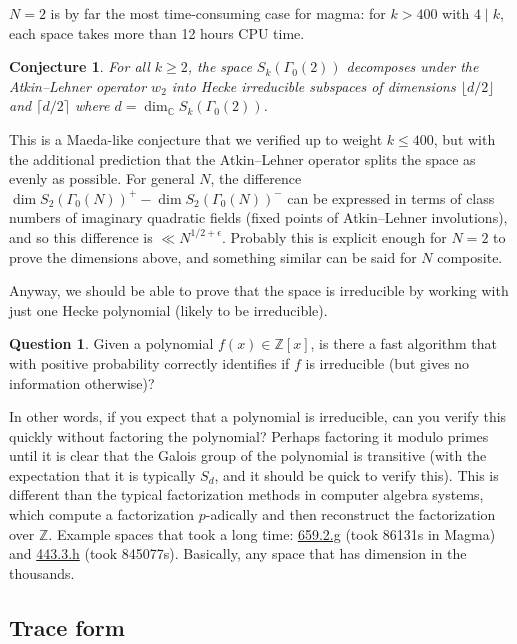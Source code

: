 \documentclass[11pt]{amsart}
\numberwithin{equation}{subsection}
\theoremstyle{plain}
\newtheorem{conj}[equation]{Conjecture}
\theoremstyle{definition}
\newtheorem{ques}[equation]{Question}
\newcommand{\Z}{\mathbb{Z}}
\newcommand{\C}{\mathbb{C}}
\begin{document}
$N=2$ is by far the most time-consuming case for magma: for $k>400$ with $4 \mid k$, each space takes more than 12 hours CPU time.  

\begin{conj}
For all $k \geq 2$, the space $S_k(\Gamma_0(2))$ decomposes under the Atkin--Lehner operator $w_2$ into Hecke irreducible subspaces of dimensions $\lfloor d/2\rfloor$ and $\lceil d/2 \rceil$ where $d=\dim_\C S_k(\Gamma_0(2))$.
\end{conj}

This is a Maeda-like conjecture that we verified up to weight $k \leq 400$, but with the additional prediction that the Atkin--Lehner operator splits the space as evenly as possible.  For general $N$, the difference $\dim S_2(\Gamma_0(N))^+ - \dim S_2(\Gamma_0(N))^-$ can be expressed in terms of class numbers of imaginary quadratic fields (fixed points of Atkin--Lehner involutions), and so this difference is $\ll N^{1/2+\epsilon}$.  Probably this is explicit enough for $N=2$ to prove the dimensions above, and something similar can be said for $N$ composite.  

Anyway, we should be able to prove that the space is irreducible by working with just one Hecke polynomial (likely to be irreducible).

\begin{ques}
Given a polynomial $f(x) \in \Z[x]$, is there a fast algorithm that with positive probability correctly identifies if $f$ is irreducible (but gives no information otherwise)?
\end{ques}

In other words, if you expect that a polynomial is irreducible, can you verify this quickly without factoring the polynomial?  Perhaps factoring it modulo primes until it is clear that the Galois group of the polynomial is transitive (with the expectation that it is typically $S_d$, and it should be quick to verify this).  This is different than the typical factorization methods in computer algebra systems, which compute a factorization $p$-adically and then reconstruct the factorization over $\Z$.  Example spaces that took a long time: \href{http://cmfskatex.lmfdb.xyz/ModularForm/GL2/Q/holomorphic/659/2/g/}{\textsf{659.2.g}} (took 86131s in Magma) and 
\href{http://cmfskatex.lmfdb.xyz/ModularForm/GL2/Q/holomorphic/443/3/h/}{\textsf{443.3.h}} (took 845077s).  Basically, any space that has dimension in the thousands.

\subsection{Trace form}
\end{document}
